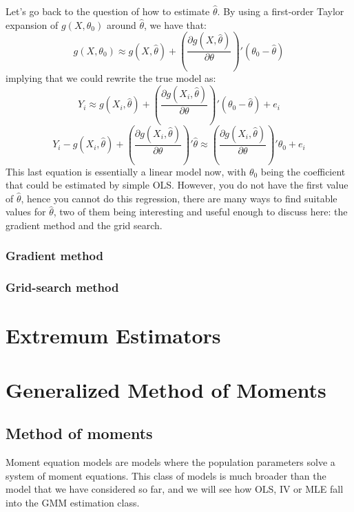 Let's go back to the question of how to estimate $\hat\theta$. By using a first-order Taylor expansion of $g(X, \theta_0)$ around $\hat\theta$, we have that: $$g(X, \theta_0)\approx g(X,\hat\theta) + \left(\frac{\partial g(X,\hat\theta)}{\partial \theta}\right)'(\theta_0 - \hat\theta) $$ implying that we could rewrite the true model as: $$Y_i \approx g(X_i,\hat\theta) + \left(\frac{\partial g(X_i,\hat\theta)}{\partial \theta}\right)'(\theta_0 - \hat\theta) + e_i $$ $$ Y_i - g(X_i,\hat\theta) + \left(\frac{\partial g(X_i,\hat\theta)}{\partial \theta}\right)'\hat\theta \approx \left(\frac{\partial g(X_i,\hat\theta)}{\partial \theta}\right)'\theta_0 + e_i $$ This last equation is essentially a linear model now, with $\theta_0$ being the coefficient that could be estimated by simple OLS. However, you do not have the first value of $\hat\theta$, hence you cannot do this regression, there are many ways to find suitable values for $\hat\theta$, two of them being interesting and useful enough to discuss here: the gradient method and the grid search.

\subsubsection{Gradient method}



\subsubsection{Grid-search method}



\section{Extremum Estimators}



\section{Generalized Method of Moments}

\subsection{Method of moments}

Moment equation models are models where the population parameters solve a system of moment equations. This class of models is much broader than the model that we have considered so far, and we will see how OLS, IV or MLE fall into the GMM estimation class.

